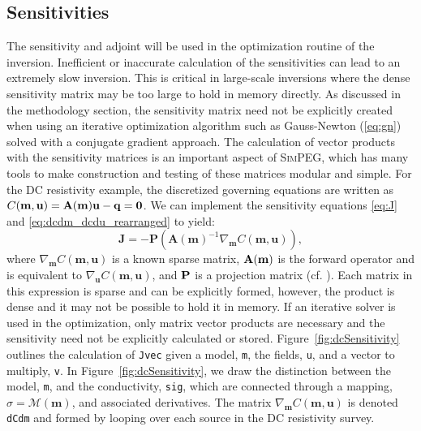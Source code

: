 \documentclass[preprint,review,3p,times,onecolumn,authoryear]{elsarticle}
\newcommand{\SimPEG}{\textsc{SimPEG}\xspace}
\newcommand{\m}{\mathbf{m}}
\renewcommand {\u}  { {\mathbf u} }
\begin{document}
\subsection{Sensitivities}
The sensitivity and adjoint will be used in the optimization routine of the inversion.
Inefficient or inaccurate calculation of the sensitivities can lead to an extremely slow inversion.
This is critical in large-scale inversions where the dense sensitivity matrix may be too large to hold in memory directly.
As discussed in the methodology section, the sensitivity matrix need not be explicitly created when using an
iterative optimization algorithm such as Gauss-Newton (\ref{eq:gn}) solved with a conjugate gradient approach.
The calculation of vector products with the sensitivity matrices is an important aspect of \SimPEG,
which has many tools to make construction and testing of these matrices modular and simple.
For the DC resistivity example, the discretized governing equations are written as $C(\mathbf{m},\mathbf{u}) = \bf A(\m)\u - q = 0$.
We can implement the sensitivity equations \ref{eq:J} and \ref{eq:dcdm_dcdu_rearranged} to yield:
{%
\begin{equation}
\mathbf{J} = - \mathbf{P}(\mathbf{A}(\m)^{-1} \nabla_\m C(\m,\u)),
\end{equation}
}
where $\nabla_\m C(\m,\u)$ is a known sparse matrix,
$\bf A(m)$ is the forward operator and is equivalent to $\nabla_\u C(\m,\u)$,
and $\bf P$ is a projection matrix (cf. \cite{Pidlisecky2007}).
Each matrix in this expression is sparse and can be explicitly formed, however,
the product is dense and it may not be possible to hold it in memory. If an iterative
solver is used in the optimization, only matrix vector products are necessary and
the sensitivity need not be explicitly calculated or stored.
Figure~\ref{fig:dcSensitivity} outlines the calculation of \texttt{Jvec}
given a model, \texttt{m}, the fields, \texttt{u}, and a vector to multiply, \texttt{v}.
In Figure~\ref{fig:dcSensitivity}, we draw the distinction between the model, \texttt{m}, and
the conductivity, \texttt{sig}, which are connected through a mapping, $\sigma = \mathcal{M}(\m)$, and associated derivatives.
The matrix $\nabla_\m C(\m,\u)$ is denoted \texttt{dCdm} and formed by looping over each
source in the DC resistivity survey.
\end{document}
